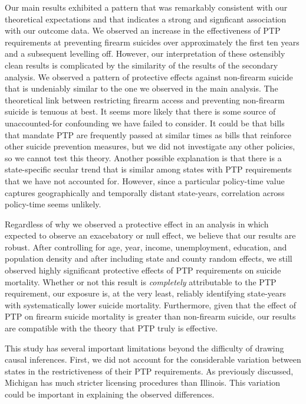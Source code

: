 \documentclass[]{article}
\begin{document}
Our main results exhibited a pattern that was remarkably consistent with
our theoretical expectations and that indicates a strong and signficant
association with our outcome data. We observed an increase in the
effectiveness of PTP requirements at preventing firearm suicides over
approximately the first ten years and a subsequent levelling off.
However, our interpretation of these ostensibly clean results is
complicated by the similarity of the results of the secondary analysis.
We observed a pattern of protective effects against non-firearm suicide
that is undeniably similar to the one we observed in the main analysis.
The theoretical link between restricting firearm access and preventing
non-firearm suicide is tenuous at best. It seems more likely that there
is some source of unaccounted-for confounding we have failed to
consider. It could be that bills that mandate PTP are frequently passed
at similar times as bills that reinforce other suicide prevention
measures, but we did not investigate any other policies, so we cannot
test this theory. Another possible explanation is that there is a
state-specific secular trend that is similar among states with PTP
requirements that we have not accounted for. However, since a particular
policy-time value captures geographically and temporally distant
state-years, correlation across policy-time seems unlikely.

Regardless of why we observed a protective effect in an analysis in
which expected to observe an exacebatory or null effect, we believe that
our results are robust. After controlling for age, year, income,
unemployment, education, and population density and after including
state and county random effects, we still observed highly significant
protective effects of PTP requirements on suicide mortality. Whether or
not this result is \emph{completely} attributable to the PTP
requirement, our exposure is, at the very least, reliably identifying
state-years with systematically lower suicide mortality. Furthermore,
given that the effect of PTP on firearm suicide mortality is greater
than non-firearm suicide, our results are compatible with the theory
that PTP truly is effective.

This study has several important limitations beyond the difficulty of
drawing causal inferences. First, we did not account for the
considerable variation between states in the restrictiveness of their
PTP requirements. As previously discussed, Michigan has much stricter
licensing procedures than Illinois. This variation could be important in
explaining the observed differences.
\end{document}
